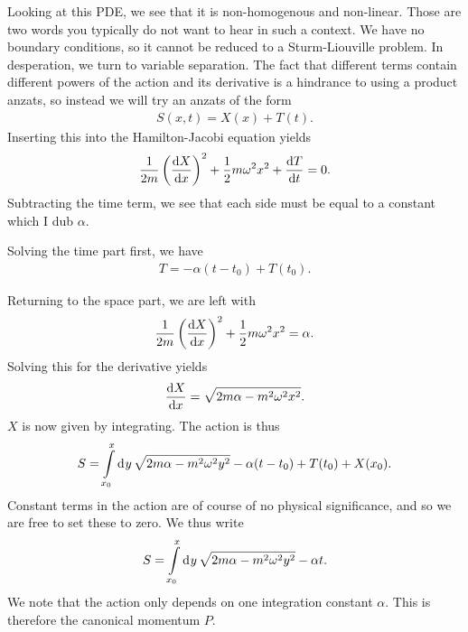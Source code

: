 Looking at this PDE, we see that it is non-homogenous and non-linear. Those are two words you typically do not want to hear in such a context. We have no boundary conditions, so it cannot be reduced to a Sturm-Liouville problem. In desperation, we turn to variable separation. The fact that different terms contain different powers of the action and its derivative is a hindrance to using a product anzats, so instead we will try an anzats of the form
\begin{align*}
	S(x, t) = X(x) + T(t).
\end{align*}
Inserting this into the Hamilton-Jacobi equation yields
\begin{align*}
	\frac{1}{2m}\left(\dv{X}{x}\right)^{2} + \frac{1}{2}m\omega^{2}x^{2} + \dv{T}{t} = 0.
\end{align*}
Subtracting the time term, we see that each side must be equal to a constant which I dub $\alpha$.

Solving the time part first, we have
\begin{align*}
	T = -\alpha(t - t_{0}) + T(t_{0}).
\end{align*}

Returning to the space part, we are left with
\begin{align*}
	\frac{1}{2m}\left(\dv{X}{x}\right)^{2} + \frac{1}{2}m\omega^{2}x^{2} = \alpha.
\end{align*}
Solving this for the derivative yields
\begin{align*}
	\dv{X}{x} = \sqrt{2m\alpha - m^{2}\omega^{2}x^{2}}.
\end{align*}
$X$ is now given by integrating. The action is thus
\begin{align*}
	S = \int\limits_{x_{0}}^{x}\dd[]{y}\sqrt{2m\alpha - m^{2}\omega^{2}y^{2}} - \alpha(t - t_{0}) + T(t_{0}) + X(x_{0}).
\end{align*}
Constant terms in the action are of course of no physical significance, and so we are free to set these to zero. We thus write
\begin{align*}
	S = \int\limits_{x_{0}}^{x}\dd[]{y}\sqrt{2m\alpha - m^{2}\omega^{2}y^{2}} - \alpha t.
\end{align*}
We note that the action only depends on one integration constant $\alpha$. This is therefore the canonical momentum $P$.

